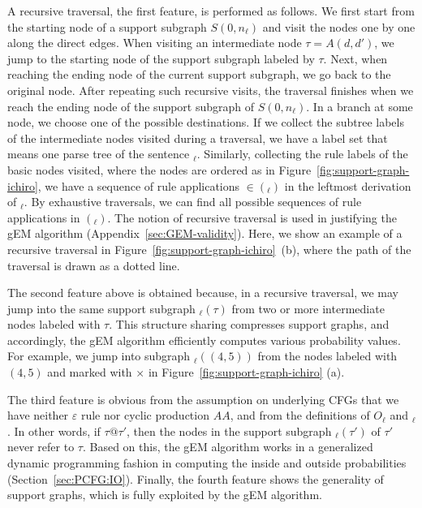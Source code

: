 \documentclass[english]{jnlp_1.4_rep}
\newcommand{\sym}[1]{}
\newcommand{\derivesplus}{}
\newcommand{\win}{}
\newcommand{\rseq}{}
\newcommand{\trees}{}
\newcommand{\subtrees}{}
\newcommand{\subsg}{}
\begin{document}
A recursive traversal, the first feature, is performed as follows.
We first start from the starting node of a
support subgraph $S(0,n_\ell)$ and visit the nodes one by one
along the direct edges.  When visiting an intermediate node
$\tau=A(d,d')$, we jump to the starting node of the support subgraph
labeled by $\tau$.  Next, when reaching the ending node of
the current support subgraph, we go back to the original node.
After repeating such recursive visits, the traversal finishes
when we reach the ending node of the support subgraph of $S(0,n_\ell)$.
In a branch at some node, we choose one of the possible
destinations.  If we collect the subtree labels of the
intermediate nodes visited during a traversal, we have a label set
that means one parse tree of the sentence $\win_\ell$.
Similarly, collecting the rule labels of the basic nodes visited,
where the nodes are ordered as in Figure~\ref{fig:support-graph-ichiro},
we have a sequence of rule applications $\rseq\in\trees(\win_\ell)$
in the leftmost derivation of $\win_\ell$.  By exhaustive traversals,
we can find all possible sequences of rule applications in
$\trees(\win_\ell)$.  The notion of recursive traversal is
used in justifying the gEM algorithm (Appendix~\ref{sec:GEM-validity}).
Here, we show an example of a recursive traversal
in Figure~\ref{fig:support-graph-ichiro}~(b), where the path
of the traversal is drawn as a dotted line.

The second feature above is obtained because, in a recursive traversal,
we may jump into the same support subgraph $\subsg_\ell(\tau)$ from
two or more intermediate nodes labeled with $\tau$.
This structure sharing compresses support graphs,
and accordingly, the gEM algorithm efficiently computes various
probability values.  For example, we jump into subgraph
$\subsg_\ell(\sym{V}(4,5))$ from the nodes labeled with
$\sym{V}(4,5)$ and marked with $\times$
in Figure~\ref{fig:support-graph-ichiro} (a).

The third feature is obvious from the assumption on underlying CFGs
that we have neither $\varepsilon$ rule nor cyclic production
$A\derivesplus A$, and from the definitions of $O_\ell$
and $\subtrees_\ell$.  In other words, if $\tau@\tau'$,
then the nodes in the support subgraph $\subsg_\ell(\tau')$
of $\tau'$ never refer to $\tau$.
Based on this, the gEM algorithm works in a generalized
dynamic programming fashion in computing the inside and outside
probabilities (Section~\ref{sec:PCFG:IO}).
Finally, the fourth feature shows the generality of
support graphs, which is fully exploited by the gEM algorithm.
\end{document}
